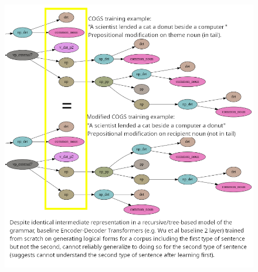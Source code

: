 \documentclass[11pt]{article}
\begin{document}
\begin{figure}
\includegraphics[scale=0.38]{new_difficult_generalization_v_dat_p2_recipient_pp_modification_predicted_and_confirmed_for_transformers_trained_from_scratch.png}

\end{figure}
\end{document}
